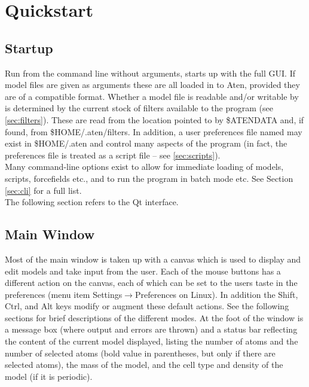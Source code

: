 \chapter{Quickstart}

\section{Startup}
\label{sec:startup}
Run from the command line without arguments, \progname{} starts up with the full GUI. If model files are given as arguments these are all loaded in to Aten, provided they are of a compatible format. Whether a model file is readable and/or writable by \progname{} is determined by the current stock of filters available to the program (see \ref{sec:filters}). These are read from the location pointed to by \$ATENDATA and, if found, from \$HOME/.aten/filters. In addition, a user preferences file named  may exist in \$HOME/.aten and control many aspects of the program (in fact, the preferences file is treated as a script file -- see \ref{sec:scripts}).\\

Many command-line options exist to allow for immediate loading of models, scripts, forcefields etc., and to run the program in batch mode etc. See Section \ref{sec:cli} for a full list.\\

The following section refers to the Qt interface.\\

\section{Main Window}
Most of the main window is taken up with a canvas which is used to display and edit models and take input from the user. Each of the mouse buttons has a different action on the canvas, each of which can be set to the users taste in the preferences (menu item Settings$\rightarrow$Preferences on Linux). In addition the Shift, Ctrl, and Alt keys modify or augment these default actions. See the following sections for brief descriptions of the different modes. At the foot of the window is a message box (where output and errors are thrown) and a status bar reflecting the content of the current model displayed, listing the number of atoms and the number of selected atoms (bold value in parentheses, but only if there are selected atoms), the mass of the model, and the cell type and density of the model (if it is periodic).\\

